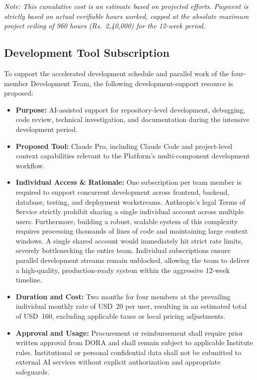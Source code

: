 \documentclass[11pt]{article}
\begin{document}
\textit{Note: This cumulative cost is an estimate based on projected efforts. Payment is strictly based on actual verifiable hours worked, capped at the absolute maximum project ceiling of 960 hours (Rs.~2,40,000) for the 12-week period.}

\subsection{Development Tool Subscription}

To support the accelerated development schedule and parallel work of the four-member Development Team, the following development-support resource is proposed:

\begin{itemize}[leftmargin=1.4em, itemsep=3pt]

\item \textbf{Purpose:} AI-assisted support for repository-level development, debugging, code review, technical investigation, and documentation during the intensive development period.

\item \textbf{Proposed Tool:} Claude Pro, including Claude Code and project-level context capabilities relevant to the Platform's multi-component development workflow.

\item \textbf{Individual Access \& Rationale:} One subscription per team member is required to support concurrent development across frontend, backend, database, testing, and deployment workstreams. Anthropic's legal Terms of Service strictly prohibit sharing a single individual account across multiple users. Furthermore, building a robust, scalable system of this complexity requires processing thousands of lines of code and maintaining large context windows. A single shared account would immediately hit strict rate limits, severely bottlenecking the entire team. Individual subscriptions ensure parallel development streams remain unblocked, allowing the team to deliver a high-quality, production-ready system within the aggressive 12-week timeline.

\item \textbf{Duration and Cost:} Two months for four members at the prevailing individual monthly rate of USD~20 per user, resulting in an estimated total of USD~160, excluding applicable taxes or local pricing adjustments.

\item \textbf{Approval and Usage:} Procurement or reimbursement shall require prior written approval from DORA and shall remain subject to applicable Institute rules. Institutional or personal confidential data shall not be submitted to external AI services without explicit authorization and appropriate safeguards.

\end{itemize}
\end{document}
